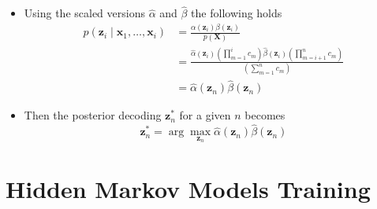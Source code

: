 \documentclass[a4, english]{article}
\begin{document}
\begin{itemize}
  \item Using the scaled versions $\hat \alpha$ and $\hat \beta$ the following holds
\begin{align*}
  p(\pmb z_i \mid \pmb x_1, \dots, \pmb x_i) &= \frac{\alpha (\pmb z_i) \beta (\pmb z_i)}{p(\pmb X)}\\
                                            &= \frac{\hat \alpha (\pmb z_i) (\prod_{m=1}^i c_m) \hat \beta (\pmb z_i)(\prod_{m=i+1}^n c_m)}{(\sum_{m=1}^nc_m)} \\
                                            &= \hat \alpha (\pmb z_n) \hat \beta (\pmb z_n)
\end{align*}

  \item Then the posterior decoding $\pmb z_n^*$ for a given $n$ becomes
\begin{equation*}
  \pmb z_n^* = \arg \max_{\pmb z_n} \hat \alpha (\pmb z_n)  \hat \beta (\pmb z_n)
\end{equation*}
\end{itemize}
  
\newpage

\section{Hidden Markov Models  Training}
\end{document}
